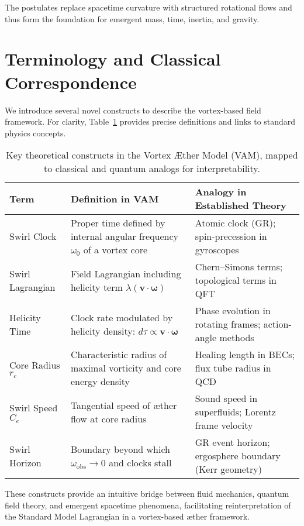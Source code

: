 The postulates replace spacetime curvature with structured rotational flows and thus form the foundation for emergent mass, time, inertia, and gravity.

\section*{Terminology and Classical Correspondence}

We introduce several novel constructs to describe the vortex-based field framework. For clarity, Table~\ref{tab:vam_definitions} provides precise definitions and links to standard physics concepts.

\begin{table}[H]
    \centering
    \footnotesize
    \renewcommand{\arraystretch}{1.2}
    \begin{tabular}{|p{3cm}|p{6.5cm}|p{6.5cm}|}
        \hline
        \textbf{Term} & \textbf{Definition in VAM} & \textbf{Analogy in Established Theory} \\
        \hline
        Swirl Clock &
        Proper time defined by internal angular frequency $\omega_0$ of a vortex core &
        Atomic clock (GR); spin-precession in gyroscopes \\
        \hline
        Swirl Lagrangian &
        Field Lagrangian including helicity term $\lambda (\mathbf{v} \cdot \boldsymbol{\omega})$ &
        Chern–Simons terms; topological terms in QFT \\
        \hline
        Helicity Time &
        Clock rate modulated by helicity density: $d\tau \propto \mathbf{v} \cdot \boldsymbol{\omega}$ &
        Phase evolution in rotating frames; action-angle methods \\
        \hline
        Core Radius $r_c$ &
        Characteristic radius of maximal vorticity and core energy density &
        Healing length in BECs; flux tube radius in QCD \\
        \hline
        Swirl Speed $C_e$ &
        Tangential speed of æther flow at core radius &
        Sound speed in superfluids; Lorentz frame velocity \\
        \hline
        Swirl Horizon &
        Boundary beyond which $\omega_{\text{obs}} \to 0$ and clocks stall &
        GR event horizon; ergosphere boundary (Kerr geometry) \\
        \hline
    \end{tabular}
    \caption{Key theoretical constructs in the Vortex Æther Model (VAM), mapped to classical and quantum analogs for interpretability.}
    \label{tab:vam_definitions}
\end{table}

These constructs provide an intuitive bridge between fluid mechanics, quantum field theory, and emergent spacetime phenomena, facilitating reinterpretation of the Standard Model Lagrangian in a vortex-based æther framework.

